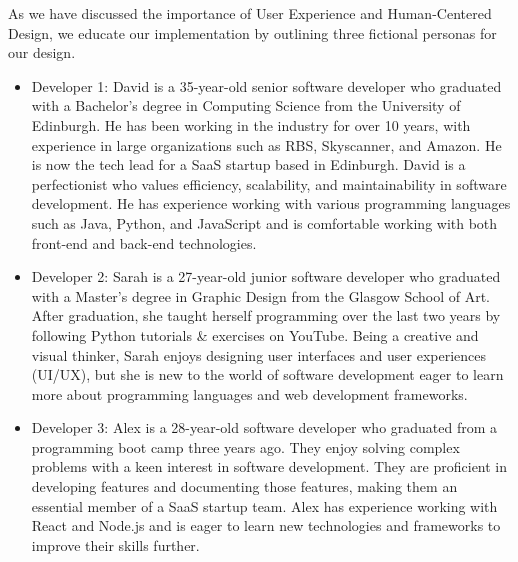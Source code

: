 \documentclass[../mpaper.tex]{subfiles}
\begin{document}
As we have discussed the importance of User Experience and Human-Centered Design, we educate our implementation by outlining three fictional personas for our design.

\begin{itemize}
    \item Developer 1: David is a 35-year-old senior software developer who graduated with a Bachelor's degree in Computing Science from the University of Edinburgh. He has been working in the industry for over 10 years, with experience in large organizations such as RBS, Skyscanner, and Amazon. He is now the tech lead for a SaaS startup based in Edinburgh. David is a perfectionist who values efficiency, scalability, and maintainability in software development. He has experience working with various programming languages such as Java, Python, and JavaScript and is comfortable working with both front-end and back-end technologies.

    \item Developer 2: Sarah is a 27-year-old junior software developer who graduated with a Master's degree in Graphic Design from the Glasgow School of Art. After graduation, she taught herself programming over the last two years by following Python tutorials \& exercises on YouTube. Being a creative and visual thinker, Sarah enjoys designing user interfaces and user experiences (UI/UX), but she is new to the world of software development eager to learn more about programming languages and web development frameworks.

    \item Developer 3: Alex is a 28-year-old software developer who graduated from a programming boot camp three years ago. They enjoy solving complex problems with a keen interest in software development. They are proficient in developing features and documenting those features, making them an essential member of a SaaS startup team. Alex has experience working with React and Node.js and is eager to learn new technologies and frameworks to improve their skills further.
\end{itemize}
\end{document}

